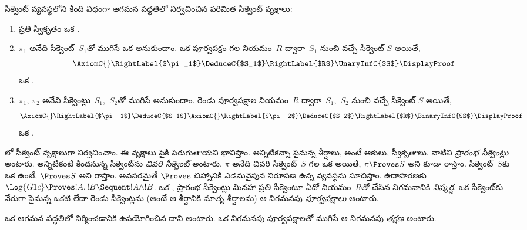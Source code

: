 \documentclass[../../../include/open-logic-section]{subfiles}
\begin{document}
\begin{defn}
సీక్వెంట్ వ్యవస్థలోని \emph{} కింది విధంగా ఆగమన పద్ధతిలో నిర్వచించిన పరిమిత సీక్వెంట్ వృక్షాలు:
\begin{enumerate}
  \item{} ప్రతి స్వీకృతం ఒక .
  \item{} $\pi_1$ అనేది సీక్వెంట్~$S_1$తో ముగిసే ఒక  అనుకుందాం. ఒక పూర్వపక్షం గల నియమం~$R$ ద్వారా~$S_1$ నుంచి వచ్చే సీక్వెంట్ $S$ అయితే,
\[
  \AxiomC{}
  \RightLabel{$\pi_1$}
  \DeduceC{$S_1$}
  \RightLabel{$R$}
  \UnaryInfC{$S$}
  \DisplayProof
  \]
  ఒక .
  \item{} $\pi_1$, $\pi_2$ అనేవి సీక్వెంట్లు~$S_1$,~$S_2$తో ముగిసే  అనుకుందాం. రెండు పూర్వపక్షాల నియమం~$R$ ద్వారా~$S_1$,~$S_2$ నుంచి వచ్చే సీక్వెంట్ $S$ అయితే,
\[
  \AxiomC{}
  \RightLabel{$\pi_1$}
  \DeduceC{$S_1$}
  \AxiomC{}
  \RightLabel{$\pi_2$}
  \DeduceC{$S_2$}
  \RightLabel{$R$}
  \BinaryInfC{$S$}
  \DisplayProof
  \]
  ఒక .
\end{enumerate}
\end{defn}

లో  సీక్వెంట్ వృక్షాలుగా నిర్వచించాం. ఈ వృక్షాలు పైకి పెరుగుతాయని భావిస్తాం. అన్నిటికన్నా పైనున్న శీర్షాలు, అంటే ఆకులు, స్వీకృతాలు. వాటిని \emph{ప్రారంభ సీక్వెంట్లు} అంటారు. అన్నిటికంటే కిందనున్న సీక్వెంట్‌ను \emph{చివరి సీక్వెంట్} అంటారు. $\pi$ అనేది చివరి సీక్వెంట్~$S$ గల ఒక  అయితే, $\pi \Proves S$ అని కూడా రాస్తాం. సీక్వెంట్~$S$కు ఒక  ఉంటే, $\Proves S$ అని రాస్తాం. అవసరమైతే $\Proves$ చిహ్నానికి ఎడమవైపున నిరూపణ ఉన్న వ్యవస్థను సూచిస్తాం. ఉదాహరణకు $\Log{G1c} \Proves !A, !B \Sequent !A \land !B$. ఒక , ప్రారంభ సీక్వెంట్లు మినహా ప్రతి సీక్వెంటూ ఏదో నియమం~$R$తో చేసిన నిగమనానికి \emph{నిష్కర్ష}. ఒక  సీక్వెంట్‌కు నేరుగా పైనున్న ఒకటి లేదా రెండు సీక్వెంట్లను (అంటే ఆ శీర్షానికి మాతృ శీర్షాలను) ఆ నిగమనపు \emph{పూర్వపక్షాలు} అంటారు.

ఒక  ఆగమన పద్ధతిలో నిర్మించడానికి ఉపయోగించిన  దాని \emph{} అంటారు. ఒక నిగమనపు పూర్వపక్షాలతో ముగిసే  ఆ నిగమనపు \emph{తక్షణ } అంటారు.
\end{document}
